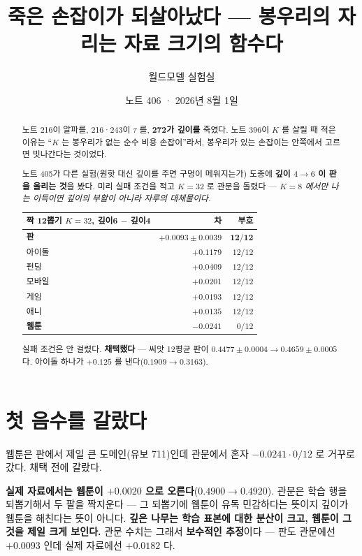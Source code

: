 \documentclass[11pt]{article}
\begin{document}
\title{죽은 손잡이가 되살아났다 --- 봉우리의 자리는 자료 크기의 함수다}
\author{월드모델 실험실}
\date{노트 406 · 2026년 8월 1일}
\maketitle

\begin{abstract}
노트 216이 알파를, 216·243이 $\tau$ 를, \textbf{272가 깊이를} 죽였다.
노트 396이 $K$ 를 살릴 때 적은 이유는 ``$K$ 는 봉우리가 없는 순수 비용
손잡이''라서, 봉우리가 있는 손잡이는 안쪽에서 고르면 빗나간다는 것이었다.

노트 405가 다른 실험(원핫 대신 깊이를 주면 구멍이 메워지는가) 도중에
\textbf{깊이 $4 \to 6$ 이 판을 올리는 것}을 봤다. 미리 실패 조건을 적고
$K{=}32$ 로 관문을 돌렸다 --- \emph{$K{=}8$ 에서만 나는 이득이면 깊이의
부활이 아니라 자루의 대체물이다.}

\begin{center}
\begin{tabular}{lrr}
\hline
짝 12뽑기 $K{=}32$, 깊이6 $-$ 깊이4 & 차 & 부호 \\
\hline
\textbf{판} & $\mathbf{+0.0093 \pm 0.0039}$ & $\mathbf{12/12}$ \\
아이돌 & $+0.1179$ & $12/12$ \\
펀딩 & $+0.0409$ & $12/12$ \\
모바일 & $+0.0201$ & $12/12$ \\
게임 & $+0.0193$ & $12/12$ \\
애니 & $+0.0135$ & $12/12$ \\
\hline
\textbf{웹툰} & $\mathbf{-0.0241}$ & $0/12$ \\
\hline
\end{tabular}
\end{center}

실패 조건은 안 걸렸다. \textbf{채택했다} --- 씨앗 12평균 판이
$0.4477 \pm 0.0004 \to \mathbf{0.4659 \pm 0.0005}$ 다. 아이돌 하나가
$+0.125$ 를 낸다($0.1909 \to 0.3163$).
\end{abstract}

\section{첫 음수를 갈랐다}

웹툰은 판에서 제일 큰 도메인(유보 711)인데 관문에서 혼자 $-0.0241 \cdot 0/12$
로 거꾸로 갔다. 채택 전에 갈랐다.

\textbf{실제 자료에서는 웹툰이 $+0.0020$ 으로 오른다}($0.4900 \to 0.4920$).
관문은 학습 행을 되뽑기해서 두 팔을 짝지운다 --- 그 되뽑기에 웹툰이 유독
민감하다는 뜻이지 깊이가 웹툰을 해친다는 뜻이 아니다. \textbf{깊은 나무는
학습 표본에 대한 분산이 크고, 웹툰이 그것을 제일 크게 보인다.} 관문 수치는
그래서 \textbf{보수적인 추정}이다 --- 판도 관문에선 $+0.0093$ 인데 실제
자료에선 $+0.0182$ 다.
\end{document}

